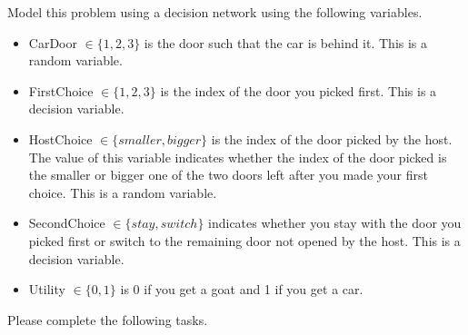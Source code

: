 \documentclass[12pt]{article}
\begin{document}
Model this problem using a decision network using the following variables.
    
\begin{itemize}

\item CarDoor $\in \{ 1, 2, 3\}$ is the door such that the car is behind it. This is a random variable.

\item FirstChoice $\in \{1, 2, 3\}$ is the index of the door you picked first. This is a decision variable.

\item HostChoice $\in \{smaller, bigger\}$ is the index of the door picked by the host. The value of this variable indicates whether the index of the door picked is the smaller or bigger one of the two doors left after you made your first choice. This is a random variable.
    
\item SecondChoice $\in \{stay, switch\}$ indicates whether you stay with the door you picked first or switch to the remaining door not opened by the host. This is a decision variable.

\item Utility $\in \{0, 1\}$ is 0 if you get a goat and 1 if you get a car. 

\end{itemize}


Please complete the following tasks.
\end{document}
